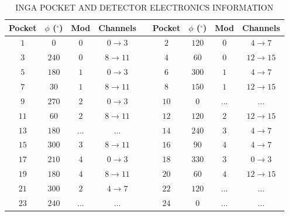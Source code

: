 \begin{table}
\caption{INGA POCKET AND DETECTOR ELECTRONICS INFORMATION\label{tbl:app2-inga-detectors}}
\begin{center}
\begin{tabular}{|c|c|c|c|c|c|c|c|c|}
\hline
\hline
Pocket & $\phi$ ($^{\circ}$) & Mod & Channels & & Pocket & $\phi$ ($^{\circ}$) & Mod & Channels\\

\hline{}  $1$&  $0$&$0$& $0\rightarrow{}3$ &  & $2$&$120$&$0$& $4\rightarrow{}7$\\
\hline{}  $3$&$240$&$0$& $8\rightarrow{}11$&  & $4$& $60$&$0$&$12\rightarrow{}15$\\

\hline{}  $5$&$180$&$1$& $0\rightarrow{}3$ &  & $6$&$300$&$1$& $4\rightarrow{}7$\\
\hline{}  $7$& $30$&$1$& $8\rightarrow{}11$&  & $8$&$150$&$1$&$12\rightarrow{}15$\\

\hline{}  $9$&$270$&$2$& $0\rightarrow{}3$ &  &$10$&  $0$&...&...\\
\hline{} $11$& $60$&$2$& $8\rightarrow{}11$&  &$12$&$120$&$2$&$12\rightarrow{}15$\\

\hline{} $13$&$180$&...&        ...        &  &$14$&$240$&$3$& $4\rightarrow{}7$\\
\hline{} $15$&$300$&$3$& $8\rightarrow{}11$&  &$16$& $90$&$4$& $4\rightarrow{}7$\\
\hline{} $17$&$210$&$4$& $0\rightarrow{}3$ &  &$18$&$330$&$3$& $0\rightarrow{}3$\\
\hline{} $19$&$180$&$4$& $8\rightarrow{}11$&  &$20$& $60$&$4$&$12\rightarrow{}15$\\
\hline{} $21$&$300$&$2$& $4\rightarrow{}7$ &  &$22$&$120$&...&...\\
\hline{} $23$&$240$&...&        ...        &  &$24$&  $0$&...&...\\
\hline
\hline
\end{tabular}
\end{center}
\end{table}
